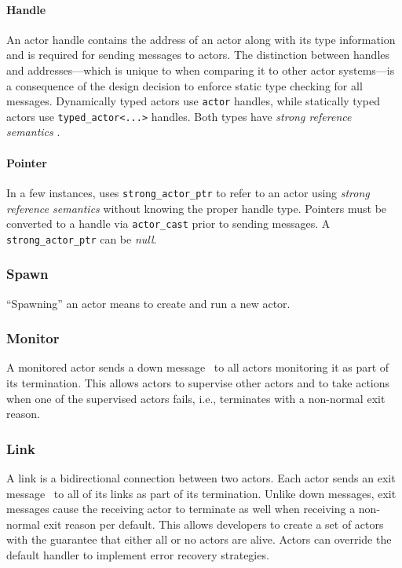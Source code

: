 \paragraph{Handle}
\label{actor-handle}

An actor handle contains the address of an actor along with its type information and is required for sending messages to actors. The distinction between handles and addresses---which is unique to \lib when comparing it to other actor systems---is a consequence of the design decision to enforce static type checking for all messages. Dynamically typed actors use \lstinline^actor^ handles, while statically typed actors use \lstinline^typed_actor<...>^ handles. Both types have \emph{strong reference semantics} .

\paragraph{Pointer}
\label{actor-pointer}

In a few instances, \lib uses \lstinline^strong_actor_ptr^ to refer to an actor using \emph{strong reference semantics}  without knowing the proper handle type. Pointers must be converted to a handle via \lstinline^actor_cast^  prior to sending messages. A \lstinline^strong_actor_ptr^ can be \emph{null}.

\subsubsection{Spawn}

``Spawning'' an actor means to create and run a new actor.

\subsubsection{Monitor}
\label{sec:monitoring}

A monitored actor sends a down message~ to all actors monitoring it as part of its termination.
This allows actors to supervise other actors and to take actions when one of the supervised actors fails, i.e., terminates with a non-normal exit reason.

\subsubsection{Link}

A link is a bidirectional connection between two actors.
Each actor sends an exit message~ to all of its links as part of its termination.
Unlike down messages, exit messages cause the receiving actor to terminate as well when receiving a non-normal exit reason per default.
This allows developers to create a set of actors with the guarantee that either all or no actors are alive.
Actors can override the default handler to implement error recovery strategies.

